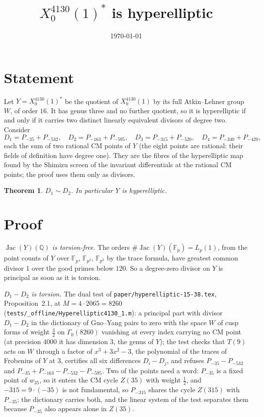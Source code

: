 \documentclass[11pt,reqno]{amsart}
\theoremstyle{plain}
\newtheorem{theorem}{Theorem}[section]
\theoremstyle{definition}
\DeclareMathOperator{\Jac}{Jac}
\newcommand{\Q}{\mathbb{Q}}
\newcommand{\F}{\mathbb{F}}
\begin{document}
\title{$X_0^{4130}(1)^*$ is hyperelliptic}
\author{}
\date{\today}
\maketitle

\section{Statement}

Let $Y=X_0^{4130}(1)^*$ be the quotient of $X_0^{4130}(1)$ by its full Atkin--Lehner group $W$, of order $16$.
It has genus three and no further quotient, so it is hyperelliptic if and only if it carries two distinct linearly
equivalent divisors of degree two. Consider
\[
D_1=P_{-35}+P_{-532},\quad D_2=P_{-163}+P_{-595},\quad D_3=P_{-315}+P_{-520},\quad D_4=P_{-340}+P_{-420},
\]
each the sum of two rational CM points of $Y$ (the eight points are rational: their fields of definition have
degree one). They are the fibres of the hyperelliptic map found by the Shimizu screen of the invariant
differentials at the rational CM points; the proof uses them only as divisors.

\begin{theorem}\label{thm:main}
$D_1\sim D_2$. In particular $Y$ is hyperelliptic.
\end{theorem}

\section{Proof}

\emph{$\Jac(Y)(\Q)$ is torsion-free.} The orders $\#\Jac(Y)(\F_p)=L_p(1)$, from the point counts of $Y$ over
$\F_p$, $\F_{p^2}$, $\F_{p^3}$ by the trace formula, have greatest common divisor $1$ over the good primes below
$120$. So a degree-zero divisor on $Y$ is principal as soon as it is torsion.

\emph{$D_1-D_2$ is torsion.} The dual test of \texttt{paper/hyperelliptic-15-38.tex}, Proposition~2.1, at
$M=4\cdot2065=8260$ (\texttt{tests/\_offline/Hyperelliptic4130\_1.m}): a principal part with divisor $D_1-D_2$ in
the dictionary of Guo--Yang pairs to zero with the space $W$ of cusp forms of weight $\tfrac32$ on $\Gamma_0(8260)$
vanishing at every index carrying no CM point (at precision $4000$ it has dimension $3$, the genus of $Y$); the test checks that $T(9)$ acts on $W$ through a factor of
$x^3+3x^2-3$, the polynomial of the traces of Frobenius of $Y$ at $3$, certifies all six differences $D_i-D_j$,
and refuses $P_{-35}-P_{-532}$ and $P_{-35}+P_{-163}-P_{-532}-P_{-595}$. Two of the points need a word: $P_{-35}$
is a fixed point of $w_{35}$, so it enters the CM cycle $Z(35)$ with weight $\tfrac12$, and $-315=9\cdot(-35)$ is
not fundamental, so $P_{-315}$ shares the cycle $Z(315)$ with $P_{-35}$; the dictionary carries both, and the
linear system of the test separates them because $P_{-35}$ also appears alone in $Z(35)$.
\end{document}
